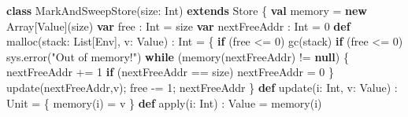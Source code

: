 \documentclass[]{article}
\newenvironment{Shaded}{}{}
\newcommand{\DecValTok}[1]{\textcolor[rgb]{0.25,0.63,0.44}{#1}}
\newcommand{\FunctionTok}[1]{\textcolor[rgb]{0.02,0.16,0.49}{#1}}
\newcommand{\KeywordTok}[1]{\textcolor[rgb]{0.00,0.44,0.13}{\textbf{#1}}}
\newcommand{\NormalTok}[1]{#1}
\newcommand{\StringTok}[1]{\textcolor[rgb]{0.25,0.44,0.63}{#1}}
\begin{document}
\begin{Shaded}
\begin{Highlighting}[]
\KeywordTok{class} \FunctionTok{MarkAndSweepStore}\NormalTok{(size: Int) }\KeywordTok{extends}\NormalTok{ Store \{}
  \KeywordTok{val}\NormalTok{ memory = }\KeywordTok{new}\NormalTok{ Array[Value](size)}
  \KeywordTok{var}\NormalTok{ free : Int = size}
  \KeywordTok{var}\NormalTok{ nextFreeAddr : Int = }\DecValTok{0}
  \KeywordTok{def} \FunctionTok{malloc}\NormalTok{(stack: List[Env], v: Value) : Int = \{}
    \KeywordTok{if}\NormalTok{ (free \textless{}= }\DecValTok{0}\NormalTok{) }\FunctionTok{gc}\NormalTok{(stack)}
    \KeywordTok{if}\NormalTok{ (free \textless{}= }\DecValTok{0}\NormalTok{) sys.}\FunctionTok{error}\NormalTok{(}\StringTok{"Out of memory!"}\NormalTok{)}
    \KeywordTok{while}\NormalTok{ (}\FunctionTok{memory}\NormalTok{(nextFreeAddr) != }\KeywordTok{null}\NormalTok{) \{}
\NormalTok{      nextFreeAddr += }\DecValTok{1}
      \KeywordTok{if}\NormalTok{ (nextFreeAddr == size) nextFreeAddr = }\DecValTok{0}
\NormalTok{    \}}
    \FunctionTok{update}\NormalTok{(nextFreeAddr,v); free {-}= }\DecValTok{1}\NormalTok{; nextFreeAddr}
\NormalTok{  \}}
  \KeywordTok{def} \FunctionTok{update}\NormalTok{(i: Int, v: Value) : Unit = \{ }\FunctionTok{memory}\NormalTok{(i) = v \}}
  \KeywordTok{def} \FunctionTok{apply}\NormalTok{(i: Int) : Value = }\FunctionTok{memory}\NormalTok{(i)}


\end{Highlighting}
\end{Shaded}
\end{document}
